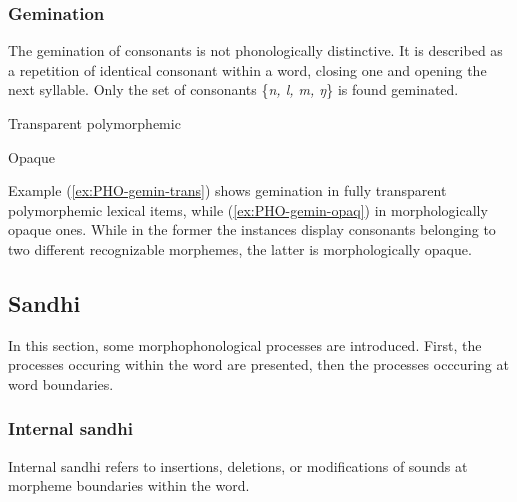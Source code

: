 \subsubsection{Gemination}
\label{sec:PHO-gemination}

The gemination of consonants is not phonologically distinctive. It  is 
described as a repetition of identical consonant within a word, closing one and 
opening the next  syllable. Only the set of consonants \{{\it n, l, m, ŋ}\} is 
found 
geminated.  




\begin{exe}
	
	\ex\label{ex:PHO-gemin-trans}{\rm Transparent polymorphemic}
	\begin{xlist}
	      
	   
	    
			\end{xlist}	
		
	\ex\label{ex:PHO-gemin-opaq}{\rm Opaque}
		\begin{xlist}
	 \quad  {\rm `fist'}
	  \quad {\rm `be worse'}
	 \quad {\rm  `pepper'}
		\end{xlist}
\end{exe}


Example (\ref{ex:PHO-gemin-trans})  shows   gemination in fully 
transparent  polymorphemic lexical items, while (\ref{ex:PHO-gemin-opaq})  in 
morphologically opaque ones. While in the former the instances display 
consonants belonging to two different recognizable morphemes, the latter is 
morphologically opaque. 


\subsection{Sandhi}
\label{sec:sandhi}

In this section,  some morphophonological processes are introduced. First,
the  processes occuring within the word are presented, then the processes
occcuring at word
boundaries. 

\subsubsection{Internal sandhi}
\label{sec:internal-sandhi}
Internal sandhi  refers to insertions, deletions,  or modifications of sounds
at morpheme boundaries within the word. 


